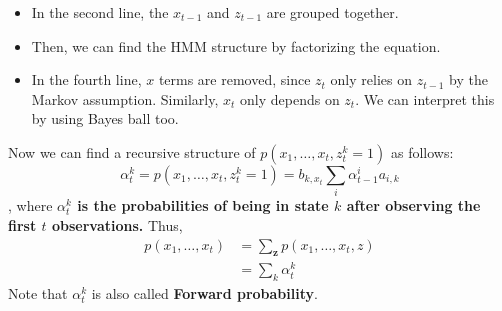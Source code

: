 \begin{itemize}
	\item In the second line, the $x_{t-1}$ and $z_{t-1}$ are grouped together. 
	\item Then, we can find the HMM structure by factorizing the equation. 
	\item In the fourth line, $x$ terms are removed, since $z_t$ only relies on $z_{t-1}$ by the Markov assumption. Similarly, $x_t$ only depends on $z_t$. We can interpret this by using Bayes ball too. 
\end{itemize}
Now we can find a recursive structure of $p(x_1,\dots,x_{t},z_{t}^k=1)$ as follows:
$$\alpha_t^k = p(x_1,\dots,x_{t},z_{t}^k=1) = b_{k,x_t}\sum_i \alpha_{t-1}^ia_{i,k}$$
, where \textbf{$\alpha_t^k$ is the probabilities of being in state $k$ after observing the first $t$ observations.} Thus, 
\begin{align*}
	p(x_1,\dots,x_{t}) & = \sum_{\mathbf{z}} p(x_1,\dots,x_{t},z)\\
	& = \sum_{k} \alpha_t^k
\end{align*}
Note that $\alpha_t^k$ is also called \textbf{Forward probability}.


